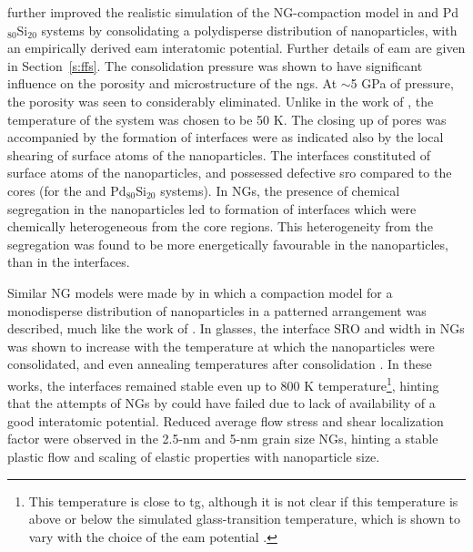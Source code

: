 \textcite{Adjaoud2018} further improved the realistic simulation of the NG-compaction model in \czsix and Pd$_{80}$Si$_{20}$ systems by consolidating a polydisperse distribution of nanoparticles, with an empirically derived \gls{eam} interatomic potential. Further details of \gls{eam} are given in Section~\ref{s:ffs}. The consolidation pressure was shown to have significant influence on the porosity and microstructure of the \gls{ng}s. At $\sim$5 GPa of pressure, the porosity was seen to considerably eliminated. Unlike in the work of \textcite{Sopu2009}, the temperature of the system was chosen to be 50 K. The closing up of pores was accompanied by the formation of interfaces were as indicated also by the local shearing of surface atoms of the nanoparticles. The interfaces constituted of surface atoms of the nanoparticles, and possessed defective \gls{sro} compared to the cores (for the \czsix and Pd$_{80}$Si$_{20}$ systems). In \czsix NGs, the presence of chemical segregation in the nanoparticles led to formation of interfaces which were chemically heterogeneous from the core regions. This heterogeneity from the segregation was found to be more energetically favourable in the \czsix nanoparticles, than in the interfaces. \par

Similar NG models were made by \textcite{Cheng2019,Cheng2019a} in which a compaction model for a monodisperse distribution of nanoparticles in a patterned arrangement was described, much like the work of \textcite{Sopu2009}. In \czsix glasses, the interface SRO and width in NGs was shown to increase with the temperature at which the nanoparticles were consolidated, and even annealing temperatures after consolidation \cite{Cheng2019,Cheng2019a}. In these works, the interfaces remained stable even up to 800 K temperature\footnote{This temperature is close to \czsix \gls{tg}, although it is not clear if this temperature is above or below the simulated glass-transition temperature, which is shown to vary with the choice of the \gls{eam} potential \cite{Mendelev2009,Mendelev2019}.}, hinting that the attempts of \cz NGs by \textcite{Sopu2009} could have failed due to lack of availability of a good interatomic potential. Reduced average flow stress and shear localization factor \cite{Shimizu2007} were observed in the 2.5-nm and 5-nm grain size NGs, hinting a stable plastic flow and scaling of elastic properties with nanoparticle size. \par

